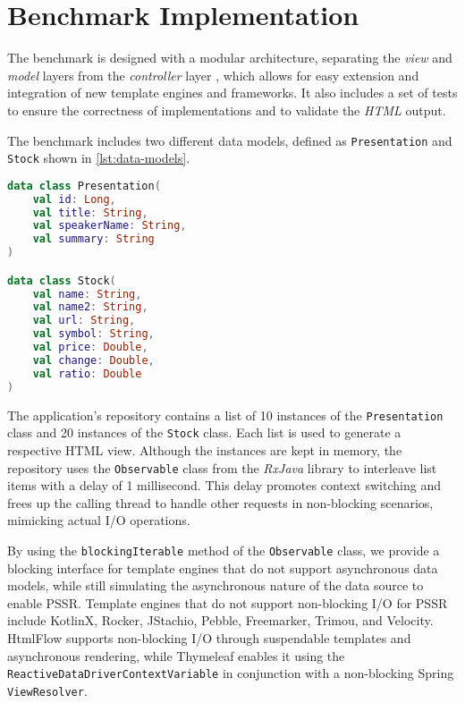 \section{Benchmark Implementation}

The benchmark is designed with a modular architecture, separating the
\textit{view} and \textit{model} layers from the \textit{controller} layer
\cite{Bucanek2009}, which allows for easy extension and integration of new
template engines and frameworks. It also includes a set of tests to ensure the
correctness of implementations and to validate the \textit{HTML} output.

The benchmark includes two different data models, defined as \texttt{Presentation} and 
\texttt{Stock} shown in \autoref{lst:data-models}. 


\lstset{style=listingstyle}

\begin{lstlisting}[language=Kotlin, caption={Data Models}, label={lst:data-models}]
data class Presentation(
    val id: Long,
    val title: String, 
    val speakerName: String,
    val summary: String
)

data class Stock(
    val name: String,
    val name2: String,
    val url: String,
    val symbol: String,
    val price: Double, 
    val change: Double, 
    val ratio: Double
)
\end{lstlisting}

The application's repository contains a list of 10 instances of the
\texttt{Presentation} class and 20 instances of the \texttt{Stock} class. Each list is used
to generate a respective HTML view. Although the instances are kept in memory,
the repository uses the \texttt{Observable} class from the \textit{RxJava}
library to interleave list items with a delay of 1 millisecond. This delay
promotes context switching and frees up the calling thread to handle other
requests in non-blocking scenarios, mimicking actual I/O operations.

By using the \texttt{blockingIterable} method of the \texttt{Observable}
class, we provide a blocking interface for template engines that do not support
asynchronous data models, while still simulating the asynchronous nature of the
data source to enable PSSR\@. Template engines that do not support non-blocking
I/O for PSSR include KotlinX, Rocker, JStachio, Pebble, Freemarker, Trimou, and
Velocity. HtmlFlow supports non-blocking I/O through suspendable templates and
asynchronous rendering, while Thymeleaf enables it using the
\texttt{ReactiveDataDriverContextVariable} in conjunction with a non-blocking
Spring \texttt{ViewResolver}.

